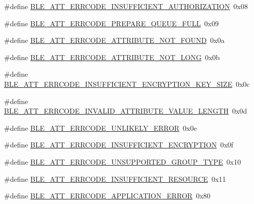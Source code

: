 \begin{DoxyCompactItemize}
\item 
\#define \hyperlink{group___b_l_e___a_t_t___e_r_r_o_r___c_o_d_e_s_ga1a8a9aaea2fba2f08483ebcf2917c569}{B\+L\+E\+\_\+\+A\+T\+T\+\_\+\+E\+R\+R\+C\+O\+D\+E\+\_\+\+I\+N\+S\+U\+F\+F\+I\+C\+I\+E\+N\+T\+\_\+\+A\+U\+T\+H\+O\+R\+I\+Z\+A\+T\+I\+ON}~0x08
\item 
\#define \hyperlink{group___b_l_e___a_t_t___e_r_r_o_r___c_o_d_e_s_gab3d0b8c1d4c822df88f1faf100b32644}{B\+L\+E\+\_\+\+A\+T\+T\+\_\+\+E\+R\+R\+C\+O\+D\+E\+\_\+\+P\+R\+E\+P\+A\+R\+E\+\_\+\+Q\+U\+E\+U\+E\+\_\+\+F\+U\+LL}~0x09
\item 
\#define \hyperlink{group___b_l_e___a_t_t___e_r_r_o_r___c_o_d_e_s_ga27a6069ece655e38bd0f92437f57b7cb}{B\+L\+E\+\_\+\+A\+T\+T\+\_\+\+E\+R\+R\+C\+O\+D\+E\+\_\+\+A\+T\+T\+R\+I\+B\+U\+T\+E\+\_\+\+N\+O\+T\+\_\+\+F\+O\+U\+ND}~0x0a
\item 
\#define \hyperlink{group___b_l_e___a_t_t___e_r_r_o_r___c_o_d_e_s_ga5a795c29c13ccea811b1c4f71a09840a}{B\+L\+E\+\_\+\+A\+T\+T\+\_\+\+E\+R\+R\+C\+O\+D\+E\+\_\+\+A\+T\+T\+R\+I\+B\+U\+T\+E\+\_\+\+N\+O\+T\+\_\+\+L\+O\+NG}~0x0b
\item 
\#define \hyperlink{group___b_l_e___a_t_t___e_r_r_o_r___c_o_d_e_s_gaa138b46f984b1e04864cebc67c474cc0}{B\+L\+E\+\_\+\+A\+T\+T\+\_\+\+E\+R\+R\+C\+O\+D\+E\+\_\+\+I\+N\+S\+U\+F\+F\+I\+C\+I\+E\+N\+T\+\_\+\+E\+N\+C\+R\+Y\+P\+T\+I\+O\+N\+\_\+\+K\+E\+Y\+\_\+\+S\+I\+ZE}~0x0c
\item 
\#define \hyperlink{group___b_l_e___a_t_t___e_r_r_o_r___c_o_d_e_s_gaac4011c91fb6e7b8da39313b663f46f7}{B\+L\+E\+\_\+\+A\+T\+T\+\_\+\+E\+R\+R\+C\+O\+D\+E\+\_\+\+I\+N\+V\+A\+L\+I\+D\+\_\+\+A\+T\+T\+R\+I\+B\+U\+T\+E\+\_\+\+V\+A\+L\+U\+E\+\_\+\+L\+E\+N\+G\+TH}~0x0d
\item 
\#define \hyperlink{group___b_l_e___a_t_t___e_r_r_o_r___c_o_d_e_s_ga187bf708abe9be0dd2c96db16ffb1249}{B\+L\+E\+\_\+\+A\+T\+T\+\_\+\+E\+R\+R\+C\+O\+D\+E\+\_\+\+U\+N\+L\+I\+K\+E\+L\+Y\+\_\+\+E\+R\+R\+OR}~0x0e
\item 
\#define \hyperlink{group___b_l_e___a_t_t___e_r_r_o_r___c_o_d_e_s_ga840545d816ab7545460967513d3c1435}{B\+L\+E\+\_\+\+A\+T\+T\+\_\+\+E\+R\+R\+C\+O\+D\+E\+\_\+\+I\+N\+S\+U\+F\+F\+I\+C\+I\+E\+N\+T\+\_\+\+E\+N\+C\+R\+Y\+P\+T\+I\+ON}~0x0f
\item 
\#define \hyperlink{group___b_l_e___a_t_t___e_r_r_o_r___c_o_d_e_s_ga9fdd3bd710cc7ae3b050e0648873a036}{B\+L\+E\+\_\+\+A\+T\+T\+\_\+\+E\+R\+R\+C\+O\+D\+E\+\_\+\+U\+N\+S\+U\+P\+P\+O\+R\+T\+E\+D\+\_\+\+G\+R\+O\+U\+P\+\_\+\+T\+Y\+PE}~0x10
\item 
\#define \hyperlink{group___b_l_e___a_t_t___e_r_r_o_r___c_o_d_e_s_ga948fc2ea56449376ba6b1533711baead}{B\+L\+E\+\_\+\+A\+T\+T\+\_\+\+E\+R\+R\+C\+O\+D\+E\+\_\+\+I\+N\+S\+U\+F\+F\+I\+C\+I\+E\+N\+T\+\_\+\+R\+E\+S\+O\+U\+R\+CE}~0x11
\item 
\#define \hyperlink{group___b_l_e___a_t_t___e_r_r_o_r___c_o_d_e_s_gacb2e428fbb5a49bddd3690975266f066}{B\+L\+E\+\_\+\+A\+T\+T\+\_\+\+E\+R\+R\+C\+O\+D\+E\+\_\+\+A\+P\+P\+L\+I\+C\+A\+T\+I\+O\+N\+\_\+\+E\+R\+R\+OR}~0x80
\end{DoxyCompactItemize}


